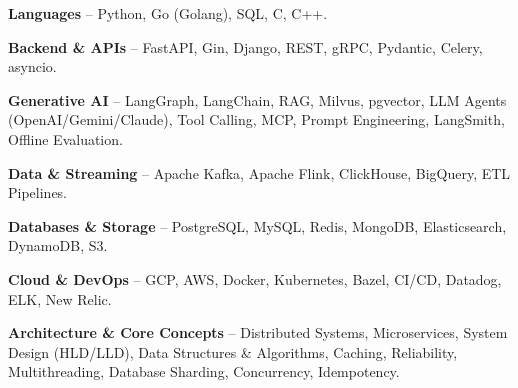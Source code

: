 \begin{zitemize}
\item \textbf{Languages} -- Python, Go (Golang), SQL, C, C++.
\item \textbf{Backend \& APIs} -- FastAPI, Gin, Django, REST, gRPC, Pydantic, Celery, asyncio.
\item \textbf{Generative AI} -- LangGraph, LangChain, RAG, Milvus, pgvector, LLM Agents (OpenAI/Gemini/Claude), Tool Calling, MCP, Prompt Engineering, LangSmith, Offline Evaluation.
\item \textbf{Data \& Streaming} -- Apache Kafka, Apache Flink, ClickHouse, BigQuery, ETL Pipelines.
\item \textbf{Databases \& Storage} -- PostgreSQL, MySQL, Redis, MongoDB, Elasticsearch, DynamoDB, S3.
\item \textbf{Cloud \& DevOps} -- GCP, AWS, Docker, Kubernetes, Bazel, CI/CD, Datadog, ELK, New Relic.
\item \textbf{Architecture \& Core Concepts} -- Distributed Systems, Microservices, System Design (HLD/LLD), Data Structures \& Algorithms, Caching, Reliability, Multithreading, Database Sharding, Concurrency, Idempotency.
\end{zitemize}

